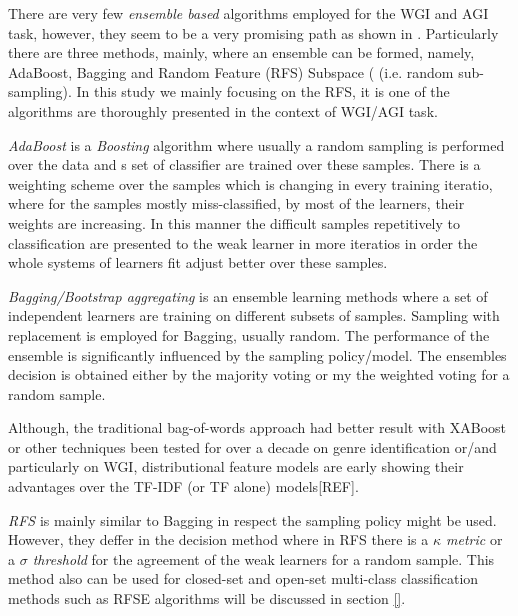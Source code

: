 There are very few \textit{ensemble based} algorithms employed for the WGI and AGI task, however, they seem to be a very promising path as shown in \parencite{onan2018ensemble,pritsos2015clef,pritsos2013open,pritsos2018open}. Particularly there are three methods, mainly, where an ensemble can be formed, namely, AdaBoost, Bagging and Random Feature (RFS) Subspace ( (i.e. random sub-sampling). In this study we mainly focusing on the RFS, it is one of the algorithms are thoroughly presented in the context of WGI/AGI task.

\textit{AdaBoost} is a \textit{Boosting} algorithm where usually a random sampling is performed over the data and s set of classifier are trained over these samples. There is a weighting scheme over the samples which is changing in every training iteratio, where for the samples mostly miss-classified, by most of the learners, their weights are increasing. In this manner the difficult samples repetitively to classification are presented to the weak learner in more iteratios in order the whole systems of learners fit adjust better over these samples.

\textit{Bagging/Bootstrap aggregating} is an ensemble learning methods where a set of independent learners are training on different subsets of samples. Sampling with replacement is employed for Bagging, usually random. The performance of the ensemble is significantly influenced by the sampling policy/model. The ensembles decision is obtained either by the majority voting or my the weighted voting for a random sample.

Although, the traditional bag-of-words approach had better result with XABoost or other techniques been tested for over a decade on genre identification or/and particularly on WGI, distributional feature models are early showing their advantages over the TF-IDF (or TF alone) models[REF].

\textit{RFS } is mainly similar to Bagging in respect the sampling policy might be used. However, they deffer in the decision method where in RFS there is a \textit{$\kappa$ metric} or a \textit{$\sigma$ threshold} for the agreement of the weak learners for a random sample. This method also can be used for closed-set and open-set multi-class classification methods such as RFSE algorithms will be discussed in section \ref{}.

